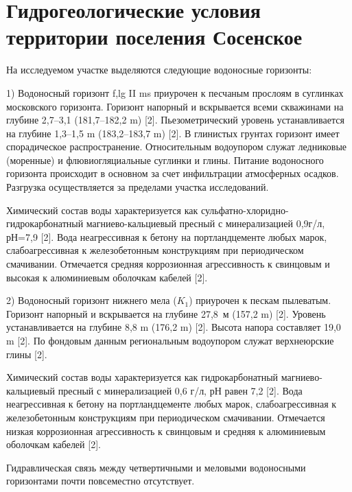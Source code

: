 \chapter{Гидрогеологические условия территории поселения Сосенское}\label{ch:ch4}

На исследуемом участке выделяются следующие водоносные горизонты:

1) Водоносный горизонт f,lg II ms приурочен к песчаным прослоям в суглинках московского горизонта. 
Горизонт напорный и вскрывается всеми скважинами на глубине 2,7--3,1 (181,7--182,2 \si{\meter}) [2]. 
Пьезометрический уровень устанавливается на глубине 1,3--1,5 \si{\meter} (183,2--183,7 \si{\meter}) [2]. 
В глинистых грунтах горизонт имеет спорадическое распространение. Относительным водоупором служат ледниковые (моренные) 
и флювиогляциальные суглинки и глины. Питание водоносного горизонта происходит в основном за счет инфильтрации атмосферных осадков. 
Разгрузка осуществляется за пределами участка исследований.

Химический состав воды характеризуется как сульфатно-хлоридно-гидрокарбонатный магниево-кальциевый пресный 
с минерализацией 0,9г/л, рН=7,9 [2]. Вода неагрессивная к бетону на портландцементе любых марок, слабоагрессивная 
к железобетонным конструкциям при периодическом смачивании. Отмечается средняя коррозионная агрессивность 
к свинцовым и высокая к алюминиевым оболочкам кабелей [2].

2) Водоносный горизонт нижнего мела ($K_1$) приурочен к пескам пылеватым. Горизонт напорный и вскрывается 
на глубине 27,8~м (157,2 \si{\meter}) [2]. Уровень устанавливается на глубине 8,8 \si{\meter} (176,2 \si{\meter}) [2]. 
Высота напора составляет 19,0 \si{\meter} [2]. 
По фондовым данным региональным водоупором служат верхнеюрские глины [2].

Химический состав воды характеризуется как гидрокарбонатный магниево-кальциевый пресный с минерализацией 0,6 г/л, 
рН равен 7,2 [2]. Вода неагрессивная к бетону на портландцементе любых марок, слабоагрессивная к железобетонным конструкциям 
при периодическом смачивании. Отмечается низкая коррозионная агрессивность к свинцовым и средняя к алюминиевым оболочкам кабелей [2].

Гидравлическая связь между четвертичными и меловыми водоносными горизонтами почти повсеместно отсутствует.